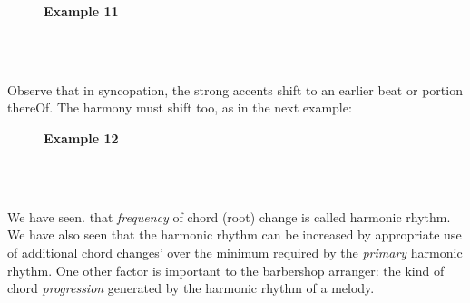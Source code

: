 \documentclass{article} %
\numberwithin{equation}{section} %
\begin{document}
		\begin{figure}[H]
		\textbf{Example 11}
		
		\\

		\\
		\end{figure}

		Observe that in syncopation, the strong accents shift to an earlier beat or portion thereOf. The harmony must shift too, as in the next example: \\

		\begin{figure}[H]
		\textbf{Example 12}
		
		\\

		\\
		\end{figure}

		We have seen. that \textit{frequency} of chord (root) change is called harmonic rhythm. We have also seen that the harmonic rhythm can be increased by appropriate use of additional chord changes' over the minimum required by the \textit{primary} harmonic rhythm. One other factor is important to the barbershop arranger: the kind of chord \textit{progression} generated by the harmonic rhythm of a melody. \\
\end{document}
